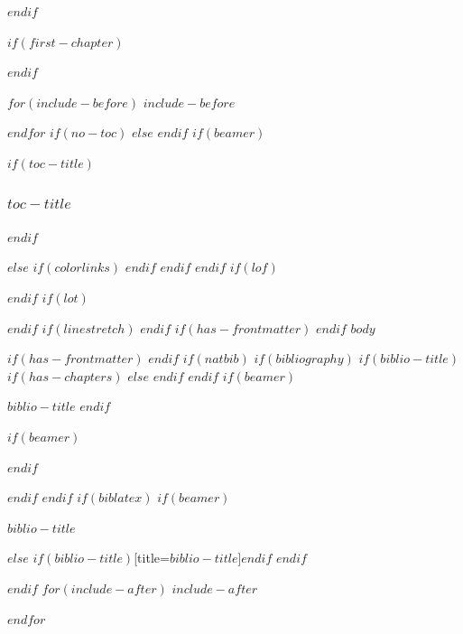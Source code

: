\documentclass[
$if(fontsize)$
  $fontsize$,
$endif$
$if(papersize)$
  $papersize$paper,
$else$
  paper=a4,
$endif$
$if(beamer)$
  ignorenonframetext,
$if(handout)$
  handout,
$endif$
$if(aspectratio)$
  aspectratio=$aspectratio$,
$endif$
$endif$
$for(classoption)$
  $classoption$$sep$,
$endfor$
  ,captions=tableheading
]{$if(beamer)$$documentclass$$else$$if(book)$scrbook$else$scrartcl$endif$$endif$}
\newif\ifbibliography
\newcounter{none} %
\begin{document}
$endif$
\setcounter{page}{0} %


$if(first-chapter)$
\setcounter{chapter}{$first-chapter$}
\addtocounter{chapter}{-1}
$endif$

$for(include-before)$
$include-before$

$endfor$
$if(no-toc)$
$else$
\renewcommand*\contentsname{$toc-title$}
\renewcommand*\contentsname{Table of Contents}
$endif$
$if(beamer)$
\begin{frame}[allowframebreaks]
$if(toc-title)$
  \frametitle{$toc-title$}
$endif$
  \tableofcontents[hideallsubsections]
\end{frame}
\newpage
$else$
{
$if(colorlinks)$
\hypersetup{linkcolor=$if(toccolor)$$toccolor$$else$$endif$}
$endif$
\setcounter{tocdepth}{$toc-depth$}
\tableofcontents
\newpage
}
$endif$
$endif$
$if(lof)$
\listoffigures
$endif$
$if(lot)$
\listoftables
$endif$
$if(linestretch)$
$endif$
$if(has-frontmatter)$
\mainmatter
$endif$
$body$

$if(has-frontmatter)$
\backmatter
$endif$
$if(natbib)$
$if(bibliography)$
$if(biblio-title)$
$if(has-chapters)$
\renewcommand\bibname{$biblio-title$}
$else$
\renewcommand\refname{$biblio-title$}
$endif$
$endif$
$if(beamer)$
\begin{frame}[allowframebreaks]{$biblio-title$}
  \bibliographytrue
$endif$
  
$if(beamer)$
\end{frame}
$endif$

$endif$
$endif$
$if(biblatex)$
$if(beamer)$
\begin{frame}[allowframebreaks]{$biblio-title$}
  \bibliographytrue
  \printbibliography[heading=none]
\end{frame}
$else$
\printbibliography$if(biblio-title)$[title=$biblio-title$]$endif$
$endif$

$endif$
$for(include-after)$
$include-after$

$endfor$
\end{document}

